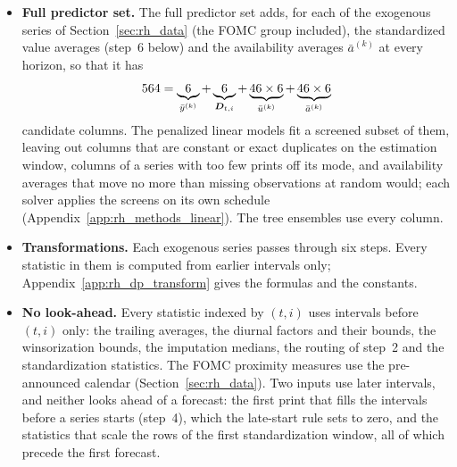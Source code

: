 \begin{itemize}
  same trailing averages of the winsorized target $\tilde y$ (\rhdmNHorizonsPooled{} columns), and the calendar vector
  $\bm D_{t,i}$ (\rhorNCalendarAf{} columns): five day-of-the-week dummies and the hour of the interval-end stamp,
  entered as an integer, not as a set of dummies. The estimation sample holds no overnight interval, so
  $\bm D_{t,i}$ has no overnight indicator; and every interval in it falls on a weekday, so the five dummies sum to one
  and are not identified separately from the intercept: the OLS fit is the minimum-norm least-squares solution
  (Appendix~\ref{app:rh_methods_linear}).
\item \textbf{Full predictor set.} The full predictor set adds, for each of the \rhdmNSeriesPooled{} exogenous series
  of Section~\ref{sec:rh_data} (the FOMC group included), the standardized value averages (step~6 below) and the
  availability averages $\bar a^{(k)}$ at every horizon, so that it has
  \[
    564 = \underbrace{6}_{\bar y^{(k)}}
      + \underbrace{6}_{\bm D_{t,i}}
      + \underbrace{46 \times 6}_{\bar u^{(k)}}
      + \underbrace{46 \times 6}_{\bar a^{(k)}}
  \]
  candidate columns. The penalized linear models fit a screened subset of them, leaving out columns that are
  constant or exact duplicates on the estimation window, columns of a series with too few prints off its mode, and
  availability averages that move no more than missing observations at random would; each solver applies the
  screens on its own schedule (Appendix~\ref{app:rh_methods_linear}). The tree ensembles use every column.
\item \textbf{Transformations.} Each exogenous series passes through six steps. Every statistic in them is computed
  from earlier intervals only; Appendix~\ref{app:rh_dp_transform} gives the formulas and the constants.
\item \textbf{No look-ahead.} Every statistic indexed by $(t,i)$ uses intervals before $(t,i)$ only: the trailing
  averages, the diurnal factors and their bounds, the winsorization bounds, the imputation medians, the routing of
  step~2 and the standardization statistics. The FOMC proximity measures use the pre-announced calendar
  (Section~\ref{sec:rh_data}). Two inputs use later intervals, and neither looks ahead of a forecast: the first print
  that fills the intervals before a series starts (step~4), which the late-start rule sets to zero, and the statistics
  that scale the rows of the first standardization window, all of which precede the first forecast.
\end{itemize}

